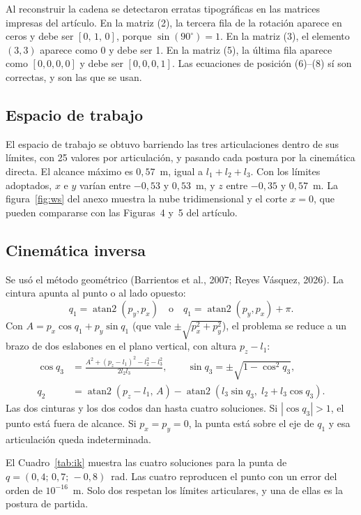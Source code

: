 \documentclass[11pt,a4paper]{article}
\begin{document}
Al reconstruir la cadena se detectaron erratas tipográficas en las matrices impresas del artículo. En la matriz (2), la tercera fila de la rotación aparece en ceros y debe ser \([0,\,1,\,0]\), porque \(\sin(90^\circ)=1\). En la matriz (3), el elemento \((3,3)\) aparece como 0 y debe ser 1. En la matriz (5), la última fila aparece como \([0,0,0,0]\) y debe ser \([0,0,0,1]\). Las ecuaciones de posición (6)--(8) sí son correctas, y son las que se usan.

\subsection{Espacio de trabajo}

El espacio de trabajo se obtuvo barriendo las tres articulaciones dentro de sus límites, con 25 valores por articulación, y pasando cada postura por la cinemática directa. El alcance máximo es \(0{,}57\)~m, igual a \(l_1+l_2+l_3\). Con los límites adoptados, \(x\) e \(y\) varían entre \(-0{,}53\) y \(0{,}53\)~m, y \(z\) entre \(-0{,}35\) y \(0{,}57\)~m. La figura~\ref{fig:ws} del anexo muestra la nube tridimensional y el corte \(x=0\), que pueden compararse con las Figuras~4 y~5 del artículo.

\subsection{Cinemática inversa}

Se usó el método geométrico (Barrientos et al., 2007; Reyes Vásquez, 2026). La cintura apunta al punto o al lado opuesto:
\begin{equation}
q_1=\operatorname{atan2}(p_y,p_x)\quad\text{o}\quad q_1=\operatorname{atan2}(p_y,p_x)+\pi .
\end{equation}
Con \(A=p_x\cos q_1+p_y\sin q_1\) (que vale \(\pm\sqrt{p_x^2+p_y^2}\)), el problema se reduce a un brazo de dos eslabones en el plano vertical, con altura \(p_z-l_1\):
\begin{align}
\cos q_3&=\frac{A^2+(p_z-l_1)^2-l_2^2-l_3^2}{2 l_2 l_3}, \qquad
\sin q_3=\pm\sqrt{1-\cos^2 q_3},\\
q_2&=\operatorname{atan2}(p_z-l_1,\,A)-\operatorname{atan2}(l_3\sin q_3,\;l_2+l_3\cos q_3).
\end{align}
Las dos cinturas y los dos codos dan hasta cuatro soluciones. Si \(|\cos q_3|>1\), el punto está fuera de alcance. Si \(p_x=p_y=0\), la punta está sobre el eje de \(q_1\) y esa articulación queda indeterminada.

El Cuadro~\ref{tab:ik} muestra las cuatro soluciones para la punta de \(q=(0{,}4;\,0{,}7;\,-0{,}8)\)~rad. Las cuatro reproducen el punto con un error del orden de \(10^{-16}\)~m. Solo dos respetan los límites articulares, y una de ellas es la postura de partida.
\end{document}
